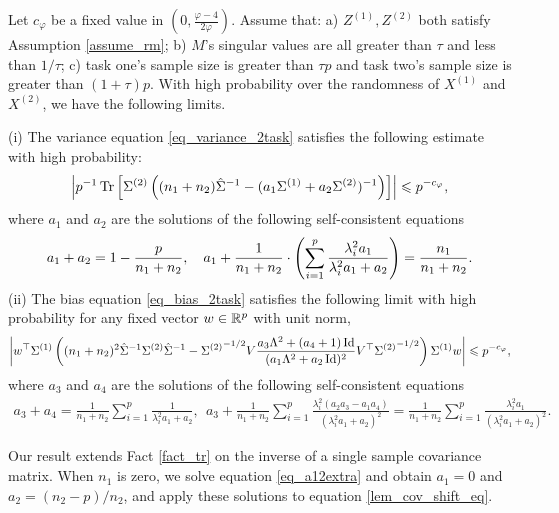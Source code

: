 \begin{theorem}\label{thm_main_RMT}
	Let $c_{\varphi}$ be a fixed value in $(0, \frac{\varphi - 4}{2\varphi})$.
	Assume that: a) $Z^{(1)}, Z^{(2)}$ both satisfy Assumption \ref{assume_rm};
	b) $M$'s singular values are all greater than $\tau$ and less than $1/\tau$;
	c) task one's sample size is greater than $\tau p$ and task two's sample size is greater than $(1 + \tau) p$.
	With high probability over the randomness of $X^{(1)}$ and $X^{(2)}$, we have the following limits.

	\noindent (i) The variance equation \eqref{eq_variance_2task} satisfies the following estimate with high probability:
			\begin{align}\label{lem_cov_shift_eq}
				\bigabs{p^{-1}\bigtr{\Sigma^{(2)} \bigbrace{(n_1 + n_2){\hat{\Sigma}^{-1}} - (a_1 \Sigma^{(1)} + a_2 \Sigma^{(2)})^{-1}}}} \le  p^{-c_{\varphi}}, %
			\end{align}
			where $a_1$ and $a_2$ are the solutions of the following self-consistent equations
			\begin{align}
				a_1 + a_2 = 1- \frac{p}{n_1 + n_2},\quad a_1 + \frac1{n_1 + n_2}\cdot \left({\sum_{i=1}^p \frac{\lambda_i^2 a_1}{\lambda_i^2 a_1 + a_2}}\right) = \frac{n_1}{n_1 + n_2}. \label{eq_a12extra}
			\end{align}
	\noindent (ii) The bias equation \eqref{eq_bias_2task} satisfies the following limit with high probability for any fixed vector $w\in\mathbb{R}^p$ with unit norm,
			\begin{align}\label{lem_cov_derv_eq}
				{\left| {w^{\top} \Sigma^{(1)} \left({(n_1+n_2)^2\hat{\Sigma}^{-1} \Sigma^{(2)} \hat{\Sigma}^{-1} - {\Sigma^{(2)}}^{-1/2} V {\frac{a_3 \Lambda^2 + (a_4 + 1)\operatorname{Id}}{(a_1 \Lambda^2 + a_2\operatorname{Id})^2}} V^{\top} {\Sigma^{(2)}}^{-1/2}}\right) \Sigma^{(1)} w} \right|} \leqslant  p^{-c_{\varphi}},
			\end{align}
				where $a_{3}$ and $a_4$ are the solutions of the following self-consistent equations %
			\begin{align}\label{eq_a34extra}
				a_3 + a_4 = \frac{1}{n_1 + n_2}\sum_{i=1}^p \frac{1}{\lambda_i^2 a_1 + a_2}, \ \ 
				a_3 + \frac{1}{n_1 + n_2} \sum_{i=1}^p \frac{\lambda_i^2 (a_2 a_3-a_1 a_4 )}{(\lambda_i^2 a_1 + a_2)^2} = \frac{1}{n_1 + n_2} \sum_{i=1}^p \frac{\lambda_i^2 a_1}{(\lambda_i^2 a_1 + a_2)^{2}}.
			\end{align}
\end{theorem}
Our result extends Fact \ref{fact_tr} on the inverse of a single sample covariance matrix.
When $n_1$ is zero, we solve equation \eqref{eq_a12extra} and obtain $a_1 = 0$ and $a_2 = (n_2-p) / n_2$, and apply these solutions to equation \eqref{lem_cov_shift_eq}.

